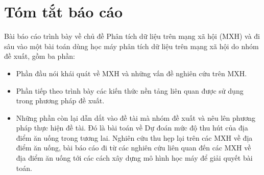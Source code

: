 \documentclass[12pt]{extarticle}
\begin{document}


	\newpage
	\thispagestyle{empty}
	\tableofcontents
	\newpage	
	\listoffigures
	\newpage
	\listoftables
	\newpage
	\section{Tóm tắt báo cáo}	
		\par Bài báo cáo trình bày về chủ đề Phân tích dữ liệu trên mạng xã hội (MXH) và đi sâu vào một bài toán dùng học máy phân tích dữ liệu trên mạng xã hội do nhóm đề xuất, gồm ba phần:
		\begin{itemize}

		\item{Phần đầu nói khái quát về MXH và những vấn đề nghiên cứu trên MXH.}	

		\item{Phần tiếp theo trình bày các kiến thức nền tảng liên quan được sử dụng trong phương pháp đề xuất.}

		\item{Những phần còn lại dẫn dắt vào đề tài mà nhóm đề xuất và nêu lên phương pháp thực hiện đề tài. Đó là bài toán về Dự đoán mức độ thu hút của địa điểm ăn uống trong tương lai. Nghiên cứu thu hẹp lại trên các MXH về địa điểm ăn uống, bài báo cáo đi từ các nghiên cứu liên quan đến các MXH về địa điểm ăn uống tới các cách xây dựng mô hình học máy để giải quyết bài toán.}
		\end{itemize}
\end{document}
